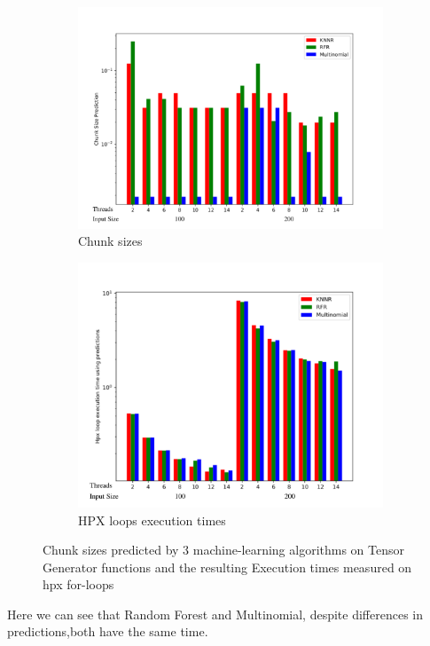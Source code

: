 \begin{figure}[h]
	\centering
	\begin{subfigure}[b]{0.5\textwidth}
		\centering
		\includegraphics[width=\textwidth]{images/bars_tensor_cs.pdf}
		\caption[Network2]%
		{{Chunk sizes}}    
	\end{subfigure}
	\hfill
	\begin{subfigure}[b]{0.49\textwidth}  
		\centering 
		\includegraphics[width=\textwidth]{images/bars_tensor_times.pdf}
		\caption[]%
		{{HPX loops execution times}}    
	\end{subfigure}
	\caption{Chunk sizes predicted by 3 machine-learning algorithms on Tensor Generator functions and the resulting Execution times measured on hpx for-loops} 
\end{figure}
Here we can see that Random Forest and Multinomial, despite differences in predictions,both have the same time.